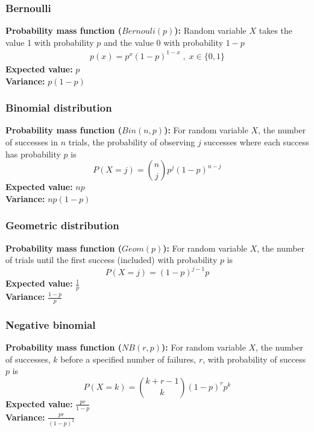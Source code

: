 \documentclass{article}
\begin{document}
\subsubsection{Bernoulli}
\textbf{Probability mass function ($Bernouli(p)$):} Random variable $X$ takes the value 1 with probability $p$ and the value 0 with probability $1-p$
\begin{align*}
    p(x) = p^x(1-p)^{1-x} \;,\; x \in \{0, 1\}
\end{align*}
\textbf{Expected value:} $p$\\
\textbf{Variance:} $p(1-p)$

\subsubsection{Binomial distribution}
\textbf{Probability mass function ($Bin(n,p)$):} For random variable $X$, the number of successes in $n$ trials, the probability of observing $j$ successes where each success has probability $p$ is
\begin{equation*}
    P(X = j) = {n \choose j} p^j (1 - p)^{n-j}
\end{equation*}
\textbf{Expected value:} $np$\\
\textbf{Variance:} $np(1-p)$

\subsubsection{Geometric distribution}
\textbf{Probability mass function ($Geom(p)$):} For random variable $X$, the number of trials until the first success (included) with probability $p$ is
\begin{equation*}
    P(X=j) = (1-p)^{j-1}p
\end{equation*}
\textbf{Expected value:} $\frac{1}{p}$\\
\textbf{Variance:} $\frac{1-p}{p}$

\subsubsection{Negative binomial}
\textbf{Probability mass function ($NB(r, p)$):} For random variable $X$, the number of successes, $k$ before a specified number of failures, $r$, with probability of success $p$ is
\begin{equation*}
	P(X = k) = {k + r - 1 \choose k} (1-p)^rp^k
\end{equation*}
\textbf{Expected value:} $\frac{pr}{1-p}$\\
\textbf{Variance:} $\frac{pr}{(1 - p)^2}$
\end{document}
